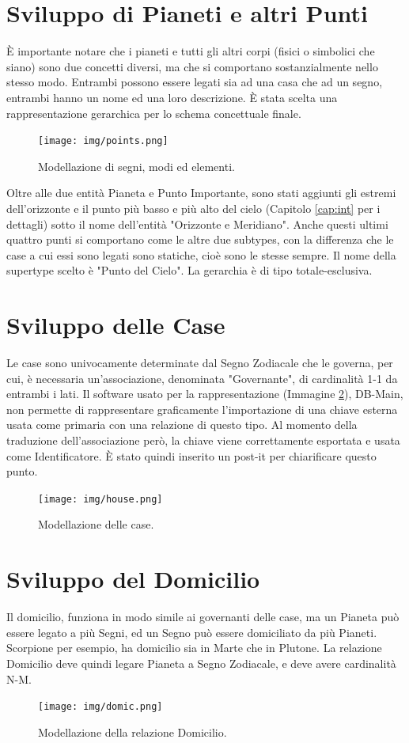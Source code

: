 \section{Sviluppo di Pianeti e altri Punti}
È importante notare che i pianeti e tutti gli altri corpi (fisici o simbolici che siano) sono due concetti diversi, ma che si comportano sostanzialmente nello stesso modo. Entrambi possono essere legati sia ad una casa che ad un segno, entrambi hanno un nome ed una loro descrizione. È stata scelta una rappresentazione gerarchica per lo schema concettuale finale.
\begin{figure}[H]
\centering
\texttt{[image: img/points.png]}
\caption{Modellazione di segni, modi ed elementi.}
\label{fig:points}
\end{figure}
Oltre alle due entità Pianeta e Punto Importante, sono stati aggiunti gli estremi dell'orizzonte e il punto più basso e più alto del cielo (Capitolo \ref{cap:int} per i dettagli) sotto il nome dell'entità "Orizzonte e Meridiano". Anche questi ultimi quattro punti si comportano come le altre due subtypes, con la differenza che le case a cui essi sono legati sono statiche, cioè sono le stesse sempre. Il nome della supertype scelto è "Punto del Cielo". La gerarchia è di tipo totale-esclusiva.

\newpage

\section{Sviluppo delle Case}
Le case sono univocamente determinate dal Segno Zodiacale che le governa, per cui, è necessaria un'associazione, denominata "Governante", di cardinalità 1-1 da entrambi i lati. Il software usato per la rappresentazione (Immagine \ref{fig:house}), DB-Main, non permette di rappresentare graficamente l'importazione di una chiave esterna usata come primaria con una relazione di questo tipo. Al momento della traduzione dell’associazione però, la chiave viene correttamente esportata e usata come Identificatore. È stato quindi inserito un post-it per chiarificare questo punto.
\begin{figure}[H]
\centering
\texttt{[image: img/house.png]}
\caption{Modellazione delle case.}
\label{fig:house}
\end{figure}

\section{Sviluppo del Domicilio}
Il domicilio, funziona in modo simile ai governanti delle case, ma un Pianeta può essere legato a più Segni, ed un Segno può essere domiciliato da più Pianeti. Scorpione per esempio, ha domicilio sia in Marte che in Plutone.\newline
La relazione Domicilio deve quindi legare Pianeta a Segno Zodiacale, e deve avere cardinalità N-M.
\begin{figure}[H]
\centering
\texttt{[image: img/domic.png]}
\caption{Modellazione della relazione Domicilio.}
\label{fig:domicile}
\end{figure}

